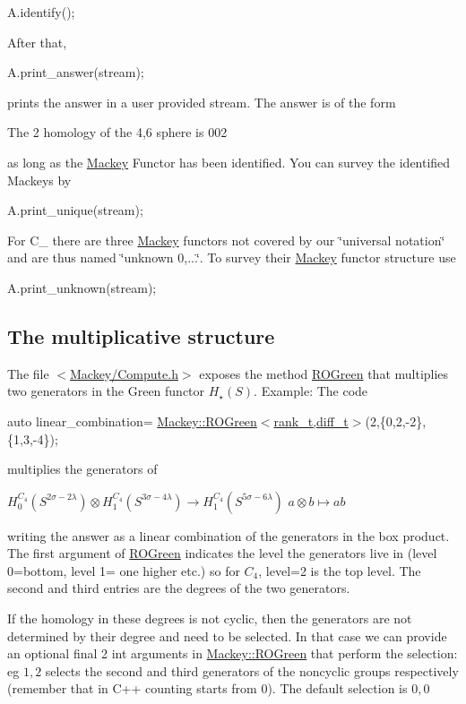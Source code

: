 {\ttfamily  A.\+identify(); }

After that,

{\ttfamily  A.\+print\+\_\+answer(stream); }

prints the answer in a user provided {\ttfamily stream}. The answer is of the form

{\ttfamily  The 2 homology of the 4,6 sphere is 002 }

as long as the \hyperlink{namespaceMackey}{Mackey} Functor has been identified. You can survey the identified Mackeys by

{\ttfamily  A.\+print\+\_\+unique(stream); }

For {\ttfamily C\+\_} there are three \hyperlink{namespaceMackey}{Mackey} functors not covered by our \char`\"{}universal notation\char`\"{} and are thus named \char`\"{}unknown 0,...\char`\"{}. To survey their \hyperlink{namespaceMackey}{Mackey} functor structure use

{\ttfamily  A.\+print\+\_\+unknown(stream); }\hypertarget{use_step1mult}{}\subsection{The multiplicative structure}\label{use_step1mult}
The file {\ttfamily $<$\hyperlink{Compute_8h}{Mackey/\+Compute.\+h}$>$} exposes the method \hyperlink{namespaceMackey_a2bd86833844ca62d76c47a54aeb0bb77}{R\+O\+Green} that multiplies two generators in the Green functor $H_{\star}(S)$. Example\+: The code

{\ttfamily  auto linear\+\_\+combination= \hyperlink{namespaceMackey_a2bd86833844ca62d76c47a54aeb0bb77}{Mackey\+::\+R\+O\+Green$<$rank\+\_\+t,diff\+\_\+t$>$}(2,\{0,2,-\/2\},\{1,3,-\/4\}); }

multiplies the generators of

$ H_0^{C_4}(S^{2\sigma-2\lambda}) \otimes H_1^{C_4}(S^{3\sigma-4\lambda}) \to H_1^{C_4}(S^{5\sigma-6\lambda}) $ $ a\otimes b\mapsto ab$

writing the answer as a linear combination of the generators in the box product. The first argument of \hyperlink{namespaceMackey_a2bd86833844ca62d76c47a54aeb0bb77}{R\+O\+Green} indicates the level the generators live in (level 0=bottom, level 1= one higher etc.) so for $C_4$, level=2 is the top level. The second and third entries are the degrees of the two generators.

If the homology in these degrees is not cyclic, then the generators are not determined by their degree and need to be selected. In that case we can provide an optional final 2 {\ttfamily int} arguments in {\ttfamily \hyperlink{namespaceMackey_a2bd86833844ca62d76c47a54aeb0bb77}{Mackey\+::\+R\+O\+Green}} that perform the selection\+: eg $1,2$ selects the second and third generators of the noncyclic groups respectively (remember that in C++ counting starts from $0$). The default selection is $0,0$

